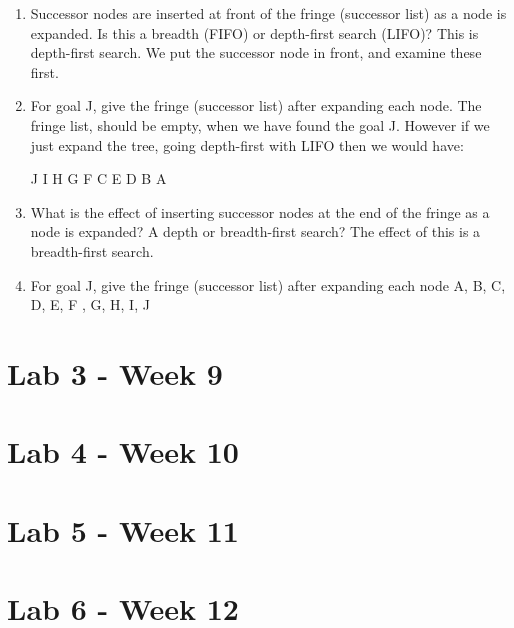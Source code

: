 \documentclass{article}
\begin{document}
\begin{enumerate}
  \item Successor nodes are inserted at front of the fringe (successor list) as
    a node is expanded. Is this a breadth (FIFO) or depth-first search (LIFO)?
    \subitem This is depth-first search. We put the successor node in front, and
    examine these first.

  \item For goal J, give the fringe (successor list) after expanding each node.
    \subitem The fringe list, should be empty, when we have found the goal J.
    However if we just expand the tree, going depth-first with LIFO then we
    would have: 
    \begin{center}
      J I H G F C E D B A 
    \end{center}
  \item What is the effect of inserting successor nodes at the end of the fringe
    as a node is expanded? A depth or breadth-first search?
    \subitem The effect of this is a breadth-first search.
  \item For goal J, give the fringe (successor list) after expanding each node
    \subitem A, B, C, D, E, F , G, H, I, J
\end{enumerate}

\newpage
\section{Lab 3 - Week 9}%
\label{sec:lab_week_9}


\newpage
\section{Lab 4 - Week 10}



\newpage
\section{Lab 5 - Week 11}


\newpage
\section{Lab 6 - Week 12}

\newpage
\printbibliography
\end{document}
